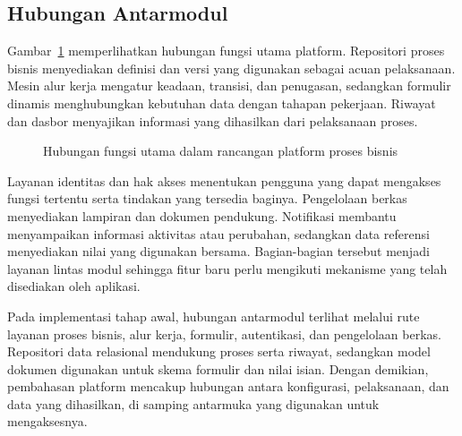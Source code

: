 \subsection{Hubungan Antarmodul}
Gambar~\ref{fig:modul-platform} memperlihatkan hubungan fungsi utama platform. Repositori proses bisnis menyediakan definisi dan versi yang digunakan sebagai acuan pelaksanaan. Mesin alur kerja mengatur keadaan, transisi, dan penugasan, sedangkan formulir dinamis menghubungkan kebutuhan data dengan tahapan pekerjaan. Riwayat dan dasbor menyajikan informasi yang dihasilkan dari pelaksanaan proses.

\begin{figure}[htbp]
\centering

\caption{Hubungan fungsi utama dalam rancangan platform proses bisnis}
\label{fig:modul-platform}
\end{figure}

Layanan identitas dan hak akses menentukan pengguna yang dapat mengakses fungsi tertentu serta tindakan yang tersedia baginya. Pengelolaan berkas menyediakan lampiran dan dokumen pendukung. Notifikasi membantu menyampaikan informasi aktivitas atau perubahan, sedangkan data referensi menyediakan nilai yang digunakan bersama. Bagian-bagian tersebut menjadi layanan lintas modul sehingga fitur baru perlu mengikuti mekanisme yang telah disediakan oleh aplikasi.

Pada implementasi tahap awal, hubungan antarmodul terlihat melalui rute layanan proses bisnis, alur kerja, formulir, autentikasi, dan pengelolaan berkas. Repositori data relasional mendukung proses serta riwayat, sedangkan model dokumen digunakan untuk skema formulir dan nilai isian. Dengan demikian, pembahasan platform mencakup hubungan antara konfigurasi, pelaksanaan, dan data yang dihasilkan, di samping antarmuka yang digunakan untuk mengaksesnya.

